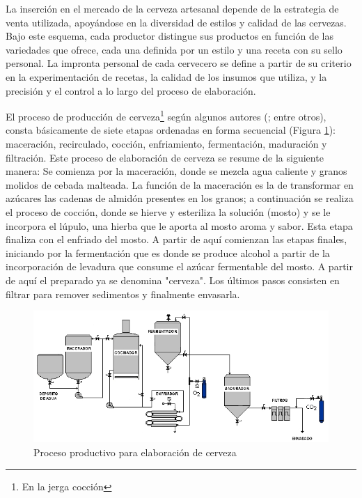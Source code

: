     \par
    La inserción en el mercado de la cerveza artesanal depende de la estrategia de venta utilizada, apoyándose en la diversidad de estilos y calidad de las cervezas. Bajo este esquema, cada productor distingue sus productos en función de las variedades que ofrece, cada una definida por un estilo y una receta con su sello personal. La impronta personal de cada cervecero se define a partir de su criterio en la experimentación de recetas, la calidad de los insumos que utiliza, y la precisión y el control a lo largo del proceso de elaboración.
    \par
    El proceso de producción de cerveza\footnote{En la jerga cocción} según algunos autores (\cite{Dummies08,DogBrewery,AmericanHomeBrewers18, Novozymes13}; entre otros), consta básicamente de siete etapas ordenadas en forma secuencial (Figura \ref{ProcFab}): maceración, recirculado, cocción, enfriamiento, fermentación, maduración y filtración. Este proceso de elaboración de cerveza se resume de la siguiente manera: Se comienza por la maceración, donde se mezcla agua caliente y granos molidos de cebada malteada. La función de la maceración es la de transformar en azúcares las cadenas de almidón presentes en los granos; a continuación se realiza el proceso de cocción, donde se hierve y esteriliza la solución (mosto) y se le incorpora el lúpulo, una hierba que le aporta al mosto aroma y sabor. Esta etapa finaliza con el enfriado del mosto. A partir de aquí comienzan las etapas finales, iniciando por la fermentación que es donde se produce alcohol a partir de la incorporación de levadura que consume el azúcar fermentable del mosto. A partir de aquí el preparado ya se denomina "cerveza". Los últimos pasos consisten en filtrar para remover sedimentos y finalmente envasarla.
 
    \begin{figure}[h]
		\centerline{\includegraphics[scale=0.7]{procDeFab.jpg}}
		\caption{Proceso productivo para elaboración de cerveza}
	    \label{ProcFab}
	\end{figure}
	

